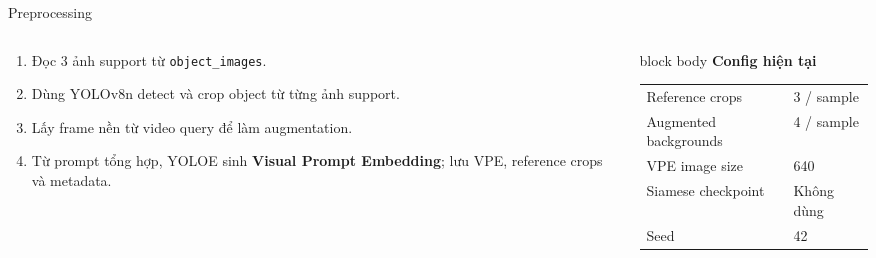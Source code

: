 \documentclass[aspectratio=169]{beamer}
\newcommand{\keyterm}[1]{\textbf{\color{MidBlue}#1}}
\newenvironment{bluebox}[1]{
  \begin{beamercolorbox}[rounded=true,shadow=false,wd=\linewidth,sep=0.28cm]{block body}
  {\bfseries\color{DeepBlue}#1}\par\vspace{0.12cm}
}{
  \end{beamercolorbox}
}
\begin{document}
\begin{frame}{Preprocessing}
  \vspace{0.28cm}
  \begin{columns}[T,onlytextwidth]
    \begin{column}{0.55\textwidth}
      \small
      \begin{enumerate}
        \setlength\itemsep{0.28em}
        \item Đọc 3 ảnh support từ \texttt{object\_images}.
        \item Dùng YOLOv8n detect và crop object từ từng ảnh support.
        \item Lấy frame nền từ video query để làm augmentation.
        \item Từ prompt tổng hợp, YOLOE sinh \keyterm{Visual Prompt Embedding}; lưu VPE, reference crops và metadata.
      \end{enumerate}
    \end{column}
    \begin{column}{0.41\textwidth}
      \begin{bluebox}{Config hiện tại}
        \scriptsize
        \begin{tabular}{ll}
          Reference crops & 3 / sample \\
          Augmented backgrounds & 4 / sample \\
          VPE image size & 640 \\
          Siamese checkpoint & Không dùng \\
          Seed & 42 \\
        \end{tabular}
      \end{bluebox}
    \end{column}
  \end{columns}
\end{frame}
\end{document}
